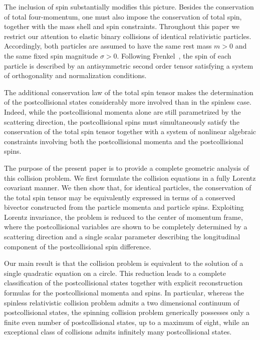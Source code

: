 \documentclass[12pt]{article}
\theoremstyle{plain}
\theoremstyle{definition}
\begin{document}
The inclusion of spin substantially modifies this picture. Besides the conservation of total four-momentum, one must also impose the conservation of total spin,  together with the mass shell and spin constraints. Throughout this paper we restrict our attention to elastic binary collisions of identical relativistic particles. Accordingly, both particles are assumed to have the same rest mass $m>0$ and the same fixed spin magnitude $\sigma>0$. Following Frenkel~\cite{Frenkel}, the spin of each particle is described by an antisymmetric second order tensor satisfying a system of orthogonality and normalization conditions. 

The additional conservation law of the total spin tensor makes the determination of the postcollisional states considerably more involved than in the spinless case. Indeed, while the postcollisional momenta alone are still parametrized by the scattering direction, the postcollisional spins must simultaneously satisfy the conservation of the total spin tensor together with a system of nonlinear algebraic constraints involving both the postcollisional momenta and the postcollisional spins.

The purpose of the present paper is to provide a complete geometric analysis of this collision problem. We first formulate the collision equations in a fully Lorentz covariant manner. We then show that, for identical particles, the conservation of the total spin tensor may be equivalently expressed in terms of a conserved bivector constructed from the particle momenta and particle spins. Exploiting Lorentz invariance, the problem is reduced to the center of momentum frame, where the postcollisional variables are shown to be completely determined by a scattering direction and a single scalar parameter describing the longitudinal component of the postcollisional spin difference.

Our main result is that the collision problem is equivalent to the solution of a single quadratic equation on a circle. This reduction leads to a complete classification of the postcollisional states together with explicit reconstruction formulas for the postcollisional momenta and spins. In particular, whereas the spinless relativistic collision problem admits a two dimensional continuum of postcollisional states, the spinning collision problem generically possesses only a finite even number of postcollisional states, up to a maximum of eight, while an exceptional class of collisions admits infinitely many postcollisional states. 
\end{document}
